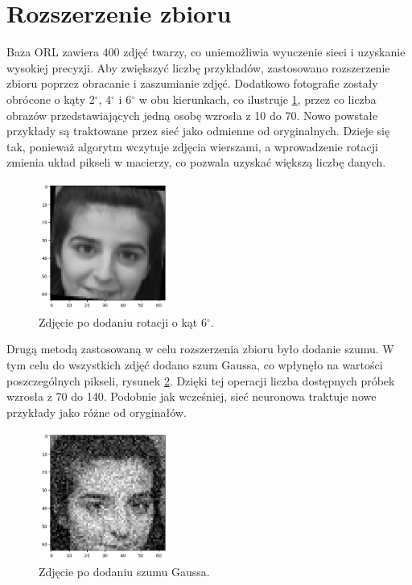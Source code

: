 \documentclass[eng,printmode]{mgr}
\begin{document}
\section{Rozszerzenie zbioru}

Baza ORL zawiera 400 zdjęć twarzy, co uniemożliwia wyuczenie sieci i uzyskanie wysokiej precyzji. Aby zwiększyć liczbę przykładów, zastosowano rozszerzenie zbioru poprzez obracanie i zaszumianie zdjęć. Dodatkowo fotografie zostały obrócone o kąty 2$^{\circ}$, 4$^{\circ}$ i 6$^{\circ}$ w obu kierunkach, co ilustruje \ref{fig:obrot}, przez co liczba obrazów przedstawiających jedną osobę wzrosła z 10 do 70. Nowo powstałe przykłady są traktowane przez sieć jako odmienne od oryginalnych. Dzieje się tak, ponieważ algorytm wczytuje zdjęcia wierszami, a wprowadzenie rotacji zmienia układ pikseli w macierzy, co pozwala uzyskać większą liczbę danych.



\begin{figure}[H]
	\centering
	\includegraphics[width=0.38\textwidth]{figures/Obrot_6.png}
	\caption{Zdjęcie po dodaniu rotacji o kąt 6$^{\circ}$.}
	\label{fig:obrot}
\end{figure}


Drugą metodą zastosowaną w celu rozszerzenia zbioru było dodanie szumu. W tym celu do wszystkich zdjęć dodano szum Gaussa, co wpłynęło na wartości poszczególnych pikseli, rysunek \ref{fig:po_szumie}. Dzięki tej operacji liczba dostępnych próbek wzrosła z 70 do 140. Podobnie jak wcześniej, sieć neuronowa traktuje nowe przykłady jako różne od oryginałów.


\begin{figure}[H]
	\centering
	\includegraphics[width=0.38\textwidth]{figures/po_szumie.png}
	\caption{Zdjęcie po dodaniu szumu Gaussa.}
	\label{fig:po_szumie}
\end{figure}
\end{document}
